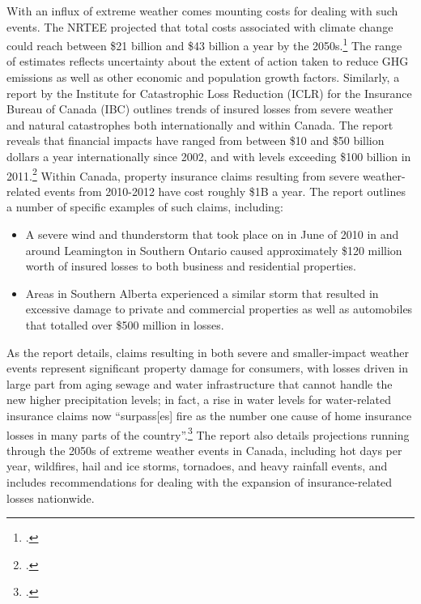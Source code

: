 With an influx of extreme weather comes mounting costs for dealing with such events. 
The NRTEE projected that total costs associated with climate change could reach between \$21 billion and \$43 billion a year by the 2050s.\footcite[][p.15]{NRTEEPrice}
The range of estimates reflects uncertainty about the extent of action taken to reduce GHG emissions as well as other economic and population growth factors. 
Similarly, a report by the Institute for Catastrophic Loss Reduction (ICLR) for the Insurance Bureau of Canada (IBC) outlines trends of insured losses from severe weather and natural catastrophes both internationally and within Canada. 
The report reveals that financial impacts have ranged from between \$10 and \$50 billion dollars a year internationally since 2002, and with levels exceeding \$100 billion in 2011.\footcite[][p. 5]{TellingWeatherStory}
Within Canada, property insurance claims resulting from severe weather-related events from 2010-2012 have cost roughly \$1B a year.
The report outlines a number of specific examples of such claims, including:
\begin{itemize}
	\item A severe wind and thunderstorm that took place on in June of 2010 in and around Leamington in Southern Ontario caused approximately \$120 million worth of insured losses to both business and residential properties.
	\item Areas in Southern Alberta experienced a similar storm that resulted in excessive damage to private and commercial properties as well as automobiles that totalled over \$500 million in losses.
\end{itemize}
As the report details, claims resulting in both severe and smaller-impact weather events represent significant property damage for consumers, with losses driven in large part from aging sewage and water infrastructure that cannot handle the new higher precipitation levels; in fact, a rise in water levels for water-related insurance claims now ``surpass[es] fire as the number one cause of home insurance losses in many parts of the country''.\footcite[][p. 7]{TellingWeatherStory}
The report also details projections running through the 2050s of extreme weather events in Canada, including hot days per year, wildfires, hail and ice storms, tornadoes, and heavy rainfall events, and includes recommendations for dealing with the expansion of insurance-related losses nationwide.


